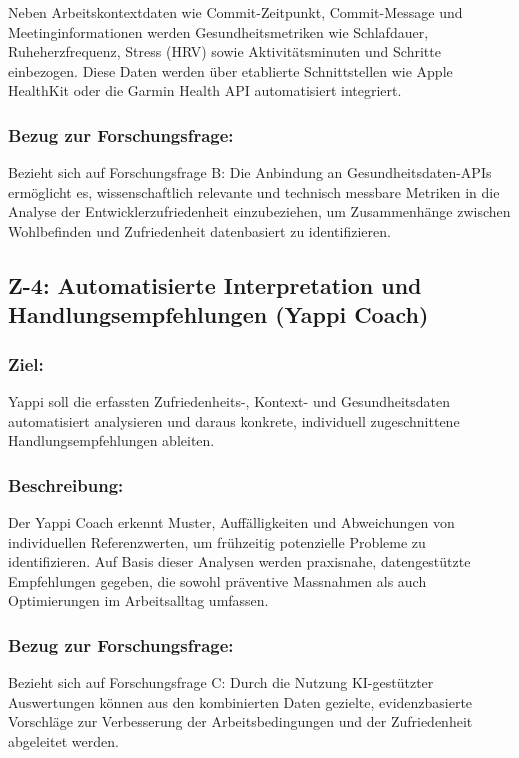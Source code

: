 \documentclass[12pt,a4paper]{report}
\begin{document}
Neben Arbeitskontextdaten wie Commit-Zeitpunkt, Commit-Message und Meetinginformationen werden Gesundheitsmetriken wie
Schlafdauer, Ruheherzfrequenz, Stress (HRV) sowie Aktivitätsminuten und Schritte einbezogen. Diese Daten werden über etablierte
Schnittstellen wie Apple HealthKit oder die Garmin Health API automatisiert integriert.

\subsubsection{Bezug zur Forschungsfrage:}

Bezieht sich auf Forschungsfrage B: Die Anbindung an Gesundheitsdaten-APIs ermöglicht es, wissenschaftlich relevante und technisch
messbare Metriken in die Analyse der Entwicklerzufriedenheit einzubeziehen, um Zusammenhänge zwischen Wohlbefinden und
Zufriedenheit datenbasiert zu identifizieren.

\subsection{Z-4: Automatisierte Interpretation und Handlungsempfehlungen (Yappi Coach)}

\subsubsection{Ziel:}

Yappi soll die erfassten Zufriedenheits-, Kontext- und Gesundheitsdaten automatisiert analysieren und daraus konkrete, individuell
zugeschnittene Handlungsempfehlungen ableiten.

\subsubsection{Beschreibung:}

Der Yappi Coach erkennt Muster, Auffälligkeiten und Abweichungen von individuellen Referenzwerten, um frühzeitig potenzielle
Probleme zu identifizieren. Auf Basis dieser Analysen werden praxisnahe, datengestützte Empfehlungen gegeben, die sowohl
präventive Massnahmen als auch Optimierungen im Arbeitsalltag umfassen.

\subsubsection{Bezug zur Forschungsfrage:}

Bezieht sich auf Forschungsfrage C: Durch die Nutzung KI-gestützter Auswertungen können aus den kombinierten Daten gezielte,
evidenzbasierte Vorschläge zur Verbesserung der Arbeitsbedingungen und der Zufriedenheit abgeleitet werden.
\end{document}
